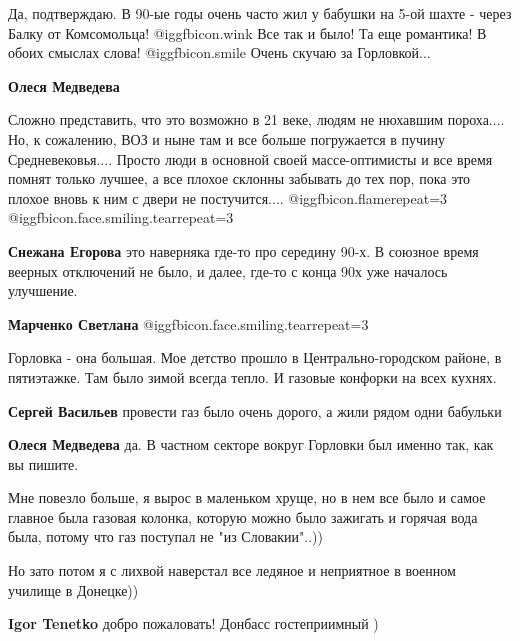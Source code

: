 \begin{itemize}
Да, подтверждаю. В 90-ые годы очень часто жил у бабушки на 5-ой шахте - через Балку от Комсомольца!  @igg{fbicon.wink} 
Все так и было! Та еще романтика! В обоих смыслах слова!  @igg{fbicon.smile} 
Очень скучаю за Горловкой...

\textbf{Олеся Медведева}

Сложно представить, что это возможно в 21 веке, людям не нюхавшим пороха....
Но, к сожалению, ВОЗ и ныне там и все больше погружается в пучину Средневековья....
Просто люди в основной своей массе-оптимисты и все время помнят только лучшее, а все плохое склонны забывать до тех пор, пока это плохое вновь к ним с двери не постучится....
 @igg{fbicon.flame}{repeat=3} 
@igg{fbicon.face.smiling.tear}{repeat=3}

\begin{itemize} %
\textbf{Снежана Егорова} это наверняка где-то про середину 90-х. В союзное время веерных отключений не было, и далее, где-то с конца 90х уже началось улучшение.


\textbf{Марченко Светлана} 
@igg{fbicon.face.smiling.tear}{repeat=3}
\end{itemize} %


Горловка - она большая. Мое детство прошло в Центрально-городском районе, в
пятиэтажке. Там было зимой всегда тепло. И газовые конфорки на всех кухнях.

\begin{itemize} %
\textbf{Сергей Васильев} провести газ было очень дорого, а жили рядом одни бабульки


\textbf{Олеся Медведева} да. В частном секторе вокруг Горловки был именно так, как вы пишите.
\end{itemize} %


Мне повезло больше, я вырос в маленьком хруще, но в нем все было и самое
главное была газовая колонка, которую можно было зажигать и горячая вода была,
потому что газ поступал не "из Словакии"..))

Но зато потом я с лихвой наверстал все ледяное и неприятное в военном училище в
Донецке))

\textbf{Igor Tenetko} добро пожаловать! Донбасс гостеприимный )


\end{itemize}

